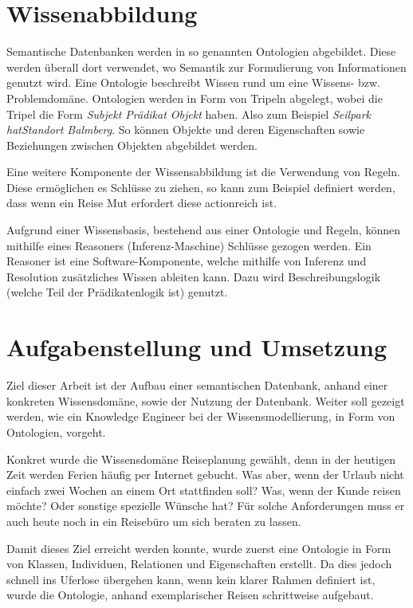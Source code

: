 \documentclass[
    paper=a4,               %
    fontsize=10pt,          %
    open=right,             %
    titlepage=false,        %
    parskip=half,           %
]{scrreprt}                 %
\begin{document}
    \begin{multicols}{3}
        \section*{Wissenabbildung}
        Semantische Datenbanken werden in so genannten Ontologien abgebildet. Diese werden überall dort verwendet, wo Semantik zur Formulierung von Informationen genutzt wird. Eine Ontologie beschreibt Wissen rund um eine Wissens- bzw. Problemdomäne. Ontologien werden in Form von Tripeln abgelegt, wobei die Tripel die Form \textit{Subjekt Prädikat Objekt} haben. Also zum Beispiel \textit{Seilpark hatStandort Balmberg}. So können Objekte und deren Eigenschaften sowie Beziehungen zwischen Objekten abgebildet werden.

        Eine weitere Komponente der Wissensabbildung ist die Verwendung von Regeln. Diese ermöglichen es Schlüsse zu ziehen, so kann zum Beispiel definiert werden, dass wenn ein Reise Mut erfordert diese actionreich ist.
        
        Aufgrund einer Wissensbasis, bestehend aus einer Ontologie und Regeln, können mithilfe eines Reasoners (Inferenz-Maschine) Schlüsse gezogen werden.
        Ein Reasoner ist eine Software-Komponente, welche mithilfe von Inferenz und Resolution zusätzliches Wissen ableiten kann. Dazu wird Beschreibungslogik (welche Teil der Prädikatenlogik ist) genutzt.

        \section*{Aufgabenstellung und Umsetzung}
        Ziel dieser Arbeit ist der Aufbau einer semantischen Datenbank, anhand einer konkreten Wissensdomäne, sowie der Nutzung der Datenbank. Weiter soll gezeigt werden, wie ein Knowledge Engineer bei der Wissensmodellierung, in Form von Ontologien, vorgeht.

        Konkret wurde die Wissensdomäne Reiseplanung gewählt, denn in der heutigen Zeit werden Ferien häufig per Internet gebucht. Was aber, wenn der Urlaub nicht einfach zwei Wochen an einem Ort stattfinden soll? Was, wenn der Kunde reisen möchte? Oder sonstige spezielle Wünsche hat? Für solche Anforderungen muss er auch heute noch in ein Reisebüro um sich beraten zu lassen.

        Damit dieses Ziel erreicht werden konnte, wurde zuerst eine Ontologie in Form von Klassen, Individuen, Relationen und Eigenschaften erstellt. Da dies jedoch schnell ins Uferlose übergehen kann, wenn kein klarer Rahmen definiert ist, wurde die Ontologie, anhand exemplarischer Reisen schrittweise aufgebaut.


\end{multicols}
\end{document}
